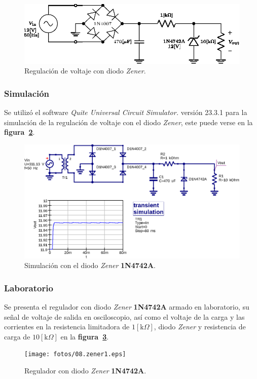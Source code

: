\begin{figure}[!h]
\centering
\includegraphics[scale=1.1]{diagramas/08.zener1.eps}
\caption{Regulación de voltaje con diodo \emph{Zener}.}
\label{circuito08}
\end{figure}

\subsubsection{Simulación}
Se utilizó el software \emph{Quite Universal Circuit Simulator.} versión 23.3.1
para la simulación de la regulación de voltaje con el diodo \emph{Zener}, este
puede verse en la \textbf{figura~\ref{simulacion08}}.

\begin{figure}[!h]
\centering
\includegraphics[scale=0.75]{simulacion/08.zener1.eps}
\caption{Simulación con el diodo \emph{Zener} \textbf{1N4742A}.}
\label{simulacion08}
\end{figure}

\subsubsection{Laboratorio}
Se presenta el regulador con diodo \emph{Zener} \textbf{1N4742A} armado en
laboratorio, su señal de voltaje de salida en osciloscopio, así como el voltaje
de la carga y las corrientes en la resistencia limitadora de
$1[\text{k}\Omega]$, diodo \emph{Zener} y resistencia de carga de
$10[\text{k}\Omega]$ en la \textbf{figura~\ref{laboratorio10}}.

\begin{figure}[!h]
\centering
\texttt{[image: fotos/08.zener1.eps]}
\caption{Regulador con diodo \emph{Zener} \textbf{1N4742A}.}
\label{laboratorio10}
\end{figure}

